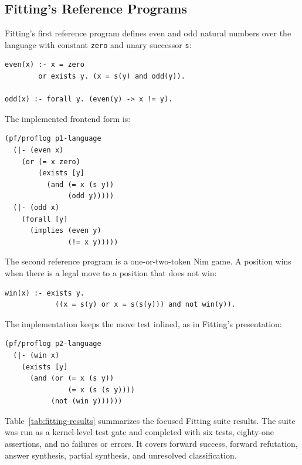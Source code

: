 \documentclass[acmsmall,screen,review,anonymous]{acmart}
\begin{document}
\subsection{Fitting's Reference Programs}

Fitting's first reference program defines even and odd natural numbers over the
language with constant \texttt{zero} and unary successor \texttt{s}:

\begin{verbatim}
even(x) :- x = zero
        or exists y. (x = s(y) and odd(y)).

odd(x) :- forall y. (even(y) -> x != y).
\end{verbatim}

The implemented frontend form is:

\begin{verbatim}
(pf/proflog p1-language
  (|- (even x)
    (or (= x zero)
        (exists [y]
          (and (= x (s y))
               (odd y)))))
  (|- (odd x)
    (forall [y]
      (implies (even y)
               (!= x y)))))
\end{verbatim}

The second reference program is a one-or-two-token Nim game.  A position wins
when there is a legal move to a position that does not win:

\begin{verbatim}
win(x) :- exists y.
            ((x = s(y) or x = s(s(y))) and not win(y)).
\end{verbatim}

The implementation keeps the move test inlined, as in Fitting's presentation:

\begin{verbatim}
(pf/proflog p2-language
  (|- (win x)
    (exists [y]
      (and (or (= x (s y))
               (= x (s (s y))))
           (not (win y))))))
\end{verbatim}

Table~\ref{tab:fitting-results} summarizes the focused Fitting suite results.
The suite was run as a kernel-level test gate and completed with six tests,
eighty-one assertions, and no failures or errors.  It covers forward success,
forward refutation, answer synthesis, partial synthesis, and unresolved
classification.
\end{document}
